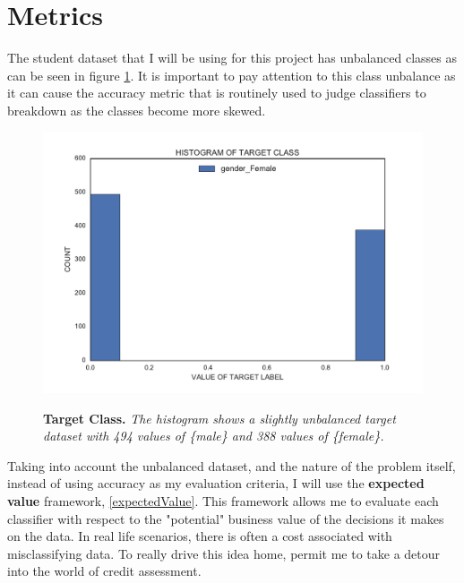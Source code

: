 \section*{Metrics}

The student dataset that I will be using for this project has unbalanced classes as can be seen in figure \ref{targetClass}. It is important to pay attention to this class unbalance as it can cause the accuracy metric that is routinely used to judge classifiers to breakdown as the classes become more skewed. 

\begin{figure}[!hbtp]
\centering

    \caption{\textbf{Target Class. }\textit{The histogram shows a slightly unbalanced target dataset with 494 values of \{male\} and 388 values of \{female\}.}}

    \includegraphics[width=1\textwidth]{figures/targetClass}
    \label{targetClass}
\end{figure}

Taking into account the unbalanced dataset, and the nature of the problem itself, instead of using accuracy as my evaluation criteria, I will use the \textbf{expected value} framework, \ref{expectedValue}. This framework allows me to evaluate each classifier with respect to the "potential" business value of the decisions it makes on the data.  In real life scenarios, there is often a cost associated with misclassifying data. To really drive this idea home, permit me to take a detour into the world of credit assessment.

